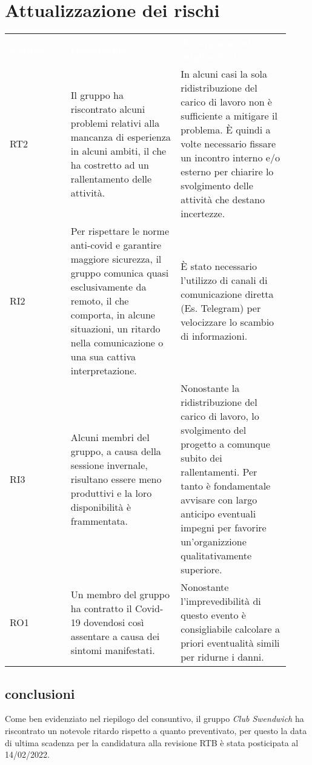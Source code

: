\section{Attualizzazione dei rischi}
\label{sec:AttualizzazioneRischi}

{\renewcommand{\arraystretch}{1.5} \small
\begin{tabular}{ >{\centering}p{0.20\linewidth} | >{\centering}p{0.36\linewidth} | >{\centering}p{0.36\linewidth}}
	\rowcolor[RGB]{33, 73, 50}
	\textcolor{white}{\textbf{Codice}} & \textcolor{white}
	{\textbf{Descrizione}} & \textcolor{white}{\textbf{Accorginmenti migliorativi}}\tabularnewline
	\rowcolor[RGB]{216, 235, 171}
	RT2
    & Il gruppo ha riscontrato alcuni problemi relativi alla mancanza di esperienza in alcuni ambiti, il che ha costretto ad un rallentamento delle attività.  
    & In alcuni casi la sola ridistribuzione del carico di lavoro non è sufficiente a mitigare il problema. È quindi a volte necessario fissare un incontro interno e/o esterno per chiarire lo svolgimento delle attività che destano incertezze.   \tabularnewline
    \rowcolor[RGB]{233, 245, 206}
	RI2
    & Per rispettare le norme anti-covid e garantire maggiore sicurezza, il gruppo comunica quasi esclusivamente da remoto, il che comporta, in alcune situazioni, un ritardo nella comunicazione o una sua cattiva interpretazione.
    & È stato necessario l'utilizzo di canali di comunicazione diretta (Es. Telegram) per velocizzare lo scambio di informazioni. \tabularnewline
    \rowcolor[RGB]{216, 235, 171}
    RI3
	& Alcuni membri del gruppo, a causa della sessione invernale, risultano essere meno produttivi e la loro disponibilità è frammentata. 
    & Nonostante la ridistribuzione del carico di lavoro, lo svolgimento del progetto a comunque subito dei rallentamenti. Per tanto è fondamentale avvisare con largo anticipo eventuali impegni per favorire un'organizzione qualitativamente superiore.  \tabularnewline
	\rowcolor[RGB]{233, 245, 206}
    RO1
	& Un membro del gruppo ha contratto il Covid-19 dovendosi così assentare a causa dei sintomi manifestati.
    & Nonostante l'imprevedibilità di questo evento è consigliabile calcolare a priori eventualità simili per ridurne i danni.   \tabularnewline
\end{tabular}	
}

\subsection{conclusioni}
Come ben evidenziato nel riepilogo del consuntivo, il gruppo \textit{Club Swendwich} ha riscontrato un notevole ritardo rispetto a quanto preventivato, per questo la data di ultima scadenza 
per la candidatura alla revisione RTB è stata posticipata al 14/02/2022.

